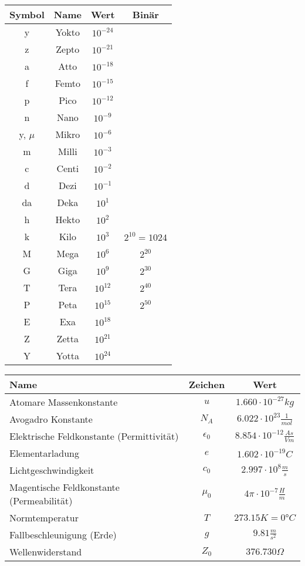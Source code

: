 \begin{multicols}{2}
		\begin{tabular}{|c|c|c|c|}
			\hline \textbf{Symbol} & \textbf{Name} & \textbf{Wert} & \textbf{Binär}\\
			\hline y 	& Yokto & $10^{-24}$ &  \\
			\hline z 	& Zepto & $10^{-21}$ &  \\
			\hline a 	& Atto & $10^{-18}$ &  \\
			\hline f 	& Femto & $10^{-15}$ & \\
			\hline p 	& Pico & $10^{-12}$ & \\
			\hline n 	& Nano & $10^{-9}$ & \\
			\hline y, $\mu$ & Mikro & $10^{-6}$ & \\
			\hline m 	& Milli	& $10^{-3}$ & \\
			\hline c	& Centi	& $10^{-2}$ &\\ 
			\hline d	& Dezi	& $10^{-1}$ &\\
			\hline da	& Deka 	& $10^1$ & \\
			\hline h	& Hekto & $10^2$ & \\ 
			\hline k	& Kilo	& $10^3$ & $2^{10} = 1024$ \\
			\hline M	& Mega	& $10^6$ & $2^{20}$\\
			\hline G	& Giga  & $10^9$ & $2^{30}$\\
			\hline T	& Tera	& $10^{12}$ & $2^{40}$ \\
			\hline P	& Peta	& $10^{15}$ & $2^{50}$\\
			\hline E 	& Exa	& $10^{18}$ & \\
			\hline Z 	& Zetta & $10^{21}$ &  \\
			\hline Y 	& Yotta & $10^{24}$ &  \\
			\hline
		\end{tabular}
		
\end{multicols}
\vspace{0.3cm}
\renewcommand{\arraystretch}{1.2}
\begin{tabular}{|l|c|c|}
	\hline \textbf{Name} & \textbf{Zeichen} & \textbf{Wert}\\
	\hline Atomare Massenkonstante & $u$ & $1.660 \cdot 10^{-27} kg$\\
	\hline Avogadro Konstante & $N_A$ & $6.022 \cdot 10^{23} \frac{1}{mol}$\\
	\hline Elektrische Feldkonstante (Permittivität) & $\epsilon_0$ & $8.854 \cdot 10^{-12} \frac{As}{Vm}$\\
	\hline Elementarladung &$e$ & $1.602 \cdot 10^{-19} C$\\
	\hline Lichtgeschwindigkeit &$c_0$ &$2.997 \cdot 10^{8} \frac{m}{s}$\\
	\hline Magentische Feldkonstante (Permeabilität)&$\mu_0$ &$4\pi \cdot 10^{-7} \frac{H}{m}$\\
	\hline Normtemperatur & $T$ & $273.15K = 0°C$\\
	\hline Fallbeschleunigung (Erde) &$g$ &$9.81 \frac{m}{s^2}$\\
	\hline Wellenwiderstand &$Z_0$ &$376.730 \Omega$\\ 
	\hline
\end{tabular}
\clearpage
\pagebreak





